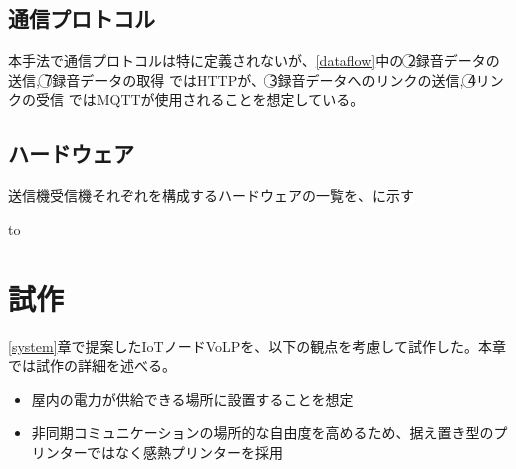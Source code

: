 \documentclass[submit,techrep,noauthor]{ipsj}
\begin{document}
\subsection{通信プロトコル}
本手法で通信プロトコルは特に定義されないが、\ref{dataflow}中の \textcircled{\scriptsize 2}録音データの送信, \textcircled{\scriptsize 7}録音データの取得 ではHTTPが、 \textcircled{\scriptsize 3}録音データへのリンクの送信, \textcircled{\scriptsize 4}リンクの受信 ではMQTTが使用されることを想定している。

\subsection{ハードウェア}
送信機受信機それぞれを構成するハードウェアの一覧を、に示す

\begin{table}[tb] 
\caption{ハードウェア一覧} 
\label{tab:sys-hardwares}
\hbox to
\end{table}

\section{試作}
\ref{system}章で提案したIoTノードVoLPを、以下の観点を考慮して試作した。本章では試作の詳細を述べる。
\begin{itemize}
    \item 屋内の電力が供給できる場所に設置することを想定
    \item 非同期コミュニケーションの場所的な自由度を高めるため、据え置き型のプリンターではなく感熱プリンターを採用
\end{itemize}
\end{document}
